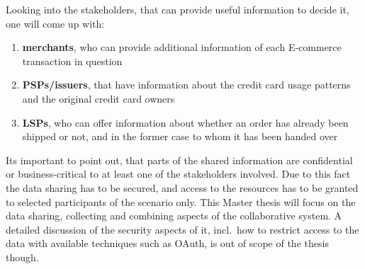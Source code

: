 Looking into the stakeholders, that can provide useful information to decide it, one will come up with:\@

\begin{enumerate}
    \item \textbf{merchants}, who can provide additional information of each \gls{E-commerce} transaction in question
    \item \textbf{\gls{PSP}s/issuers}, that have information about the credit card usage patterns and the original credit card owners
    \item \textbf{\gls{LSP}s}, who can offer information about whether an order has already been shipped or not, and in the former case to whom it has been handed over
\end{enumerate}

Its important to point out, that parts of the shared information are confidential or business-critical to at least one of the stakeholders involved. Due to this fact the data sharing has to be secured, and access to the resources has to be granted to selected participants of the scenario only. This Master thesis will focus on the data sharing, collecting and combining aspects of the collaborative system. A detailed discussion of the security aspects of it, incl.\ how to restrict access to the data with available techniques such as \gls{OAuth}, is out of scope of the thesis though.

